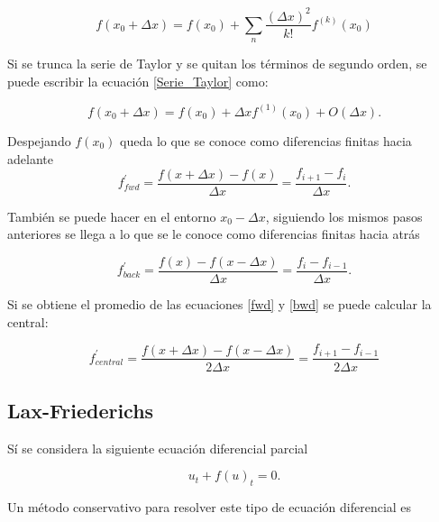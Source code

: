 \documentclass[12pt,a4paper]{book}
\begin{document}
\begin{equation}\label{Serie_Taylor}
f\left( x_0 + \Delta x\right) = f\left( x_0 \right)+
\sum_n \frac{\left( \Delta x \right) ^2}{k!}f^{(k)} \left(x_0
\right)
\end{equation}

Si se trunca la serie de Taylor y se quitan los términos de segundo orden, se puede escribir la ecuación \ref{Serie_Taylor} como:

\begin{equation}
f\left( x_0 + \Delta x \right) = f(x_0) + \Delta x f^{(1)} (x_0) + O \left( \Delta x \right).
\end{equation}

\noindent Despejando $f(x_0)$ queda lo que se conoce como diferencias finitas hacia adelante
\begin{equation}\label{fwd}
f_{fwd}^{'}=\frac{f\left(x + \Delta x \right) - f(x) }{\Delta x}=\frac{f_{i+1}-f_{i}}{\Delta x}.
\end{equation}

\noindent También se puede hacer en el entorno $x_0- \Delta x$, siguiendo los mismos pasos anteriores se llega a lo que se le conoce como diferencias finitas hacia atrás


\begin{equation}\label{bwd}
f_{back}^{'}=\frac{f\left(x \right) - f(x - \Delta x) }{\Delta x}=\frac{f_{i}-f_{i-1}}{\Delta x}.
\end{equation}

\noindent Si se obtiene el promedio de las ecuaciones \ref{fwd} y \ref{bwd} se puede calcular la central:

\begin{equation} \label{Centrada}
f_{central}^{'}=\frac{f\left(x + \Delta x\right) - f(x - \Delta x) }{2\Delta x}=\frac{f_{i+1}-f_{i-1}}{2 \Delta x}
\end{equation}



\subsection{Lax-Friederichs}

Sí se considera la siguiente ecuación diferencial parcial \citep{Duchateau2002}

\begin{equation} \label{ecu_conser}
u_t+ f\left(u \right)_t=0.
\end{equation}

\noindent Un método conservativo para resolver este tipo de ecuación diferencial es 
\end{document}
